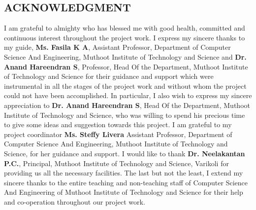 \begin{center}
    \section*{ACKNOWLEDGMENT}
\end{center}

\noindent
\newline
I am grateful to almighty who has blessed me with good health, committed and continuous interest throughout the project work.
\newline
\newline
I express my sincere thanks to my guide, \textbf{Ms. Fasila K A}, Assistant Professor, Department of Computer Science And Engineering, Muthoot Institute of Technology and Science and \textbf{Dr. Anand Hareendran S}, Professor, Head Of the Department, Muthoot Institute of Technology and Science for their guidance and support which were instrumental in all the stages of the project work and without whom the project could not have been accomplished.
\newline
\newline
In particular, I also wish to express my sincere appreciation to \textbf{Dr. Anand Hareendran S}, Head Of the Department, Muthoot Institute of Technology and Science, who was willing to spend his precious time to give some ideas and suggestion towards this project.
\newline
\newline
I am grateful to my project coordinator \textbf{Ms. Steffy Livera } Assistant Professor, Department of Computer Science And Engineering, Muthoot Institute of Technology and Science, for her guidance and support.
\newline
\newline
I would like to thank \textbf{Dr. Neelakantan P.C.}, Principal, Muthoot Institute of Technology and Science, Varikoli for providing us all the necessary facilities.
\newline
\newline
The last but not the least, I extend my sincere thanks to the entire teaching and non-teaching staff of Computer Science And Engineering of Muthoot Institute of Technology and Science for their help and co-operation throughout our project work.

